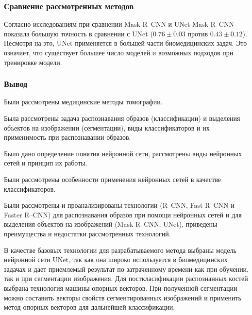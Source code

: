 \subsubsection{Сравнение рассмотренных методов}

Согласно исследованиям \cite{segcomp} при сравнении Mask R--CNN и UNet Mask R--CNN показала большую точность в сравнении с UNet ($0.76 \pm 0.03$ против $0.43 \pm 0.12$). Несмотря на это, UNet применяется в большей части биомедицинских задач. Это означает, что существует большее число моделей и возможных подходов при тренировке модели.

\subsubsection*{Вывод}

Были рассмотрены медицинские методы томографии.

Была рассмотрены задача распознавания образов (классификации) и выделения объектов на изображении (сегментации), виды классификаторов и их применимость при распознавании образов.

Было дано определение понятия нейронной сети, рассмотрены виды нейронных сетей и принцип их работы.

Были рассмотрены особенности применения нейронных сетей в качестве классификаторов.

Были рассмотрены и проанализированы технологии (R--CNN, Fast R--CNN и Faster R--CNN) для распознавания образов при помощи нейронных сетей и для выделения объектов на изображений (Mask R--CNN, UNet), приведены преимущества и недостатки рассмотренных технологий.

В качестве базовых технологии для разрабатываемого метода выбраны модель нейронной сети UNet, так как она широко используется в биомедицинских задачах и дает приемлемый результат по затраченному времени как при обучении, так и при сегментации изображения. Для посткласификации распознанных костей выбрана технология машины опорных векторов. При полученной сегментации можно составить векторы свойств сегментированных изображений и применить метод опорных векторов для дальнейшей классификации.